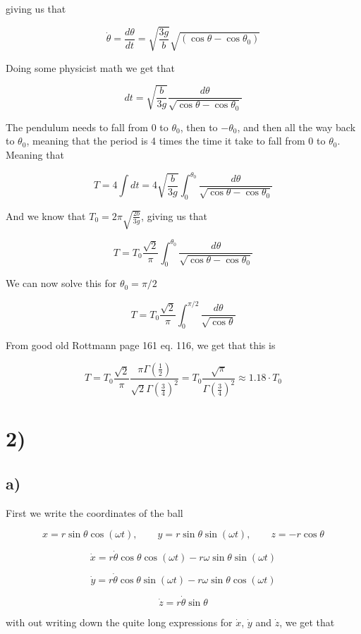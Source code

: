 \documentclass[a4paper,norsk, 10pt]{article}
\begin{document}
giving us that

$$
\dot{\theta} = \frac{d\theta}{dt} = \sqrt{\frac{3g}{b}}\sqrt{(\cos\theta - \cos\theta_0)}
$$

Doing some physicist math we get that

$$
dt = \sqrt{\frac{b}{3g}}\frac{d\theta}{\sqrt{\cos\theta - \cos\theta_0}}
$$

The pendulum needs to fall from $0$ to $\theta_0$, then to $-\theta_0$, and then all the way back to $\theta_0$, meaning that the period is 4 times the time it take to fall from $0$ to $\theta_0$. Meaning that 

$$
T = 4\int dt = 4\sqrt{\frac{b}{3g}}\int_0^{\theta_0} \frac{d\theta}{\sqrt{\cos\theta - \cos\theta_0}}
$$

And we know that $T_0 = 2\pi \sqrt{\frac{2b}{3g}}$, giving us that

$$
T = T_0 \frac{\sqrt{2}}{\pi}\int_0^{\theta_0} \frac{d\theta}{\sqrt{\cos\theta - \cos\theta_0}}
$$

We can now solve this for $\theta_0 = \pi/2$

$$
T = T_0 \frac{\sqrt{2}}{\pi}\int_0^{\pi/2} \frac{d\theta}{\sqrt{\cos\theta}}
$$

From good old Rottmann page 161 eq. 116, we get that this is

$$
T = T_0 \frac{\sqrt{2}}{\pi} \frac{\pi \Gamma(\frac{1}{2})}{\sqrt{2}\Gamma(\frac{3}{4})^2} = T_0\frac{\sqrt{\pi}}{\Gamma(\frac{3}{4})^2} \approx 1.18 \cdot T_0
$$

\section*{2)}
\subsection*{a)}
First we write the coordinates of the ball

$$
x = r\sin\theta \cos(\omega t), \qquad y = r\sin\theta \sin(\omega t), \qquad z = -r\cos \theta
$$

$$
\dot{x} = r\dot{\theta}\cos\theta \cos(\omega t) - r\omega\sin\theta \sin(\omega t) 
$$

$$
\dot{y} = r\dot{\theta}\cos\theta \sin(\omega t) - r\omega\sin\theta \cos(\omega t) 
$$

$$
\dot{z} = r\dot{\theta}\sin \theta
$$

with out writing down the quite long expressions for $\dot{x}$, $\dot{y}$ and $\dot{z}$, we get that
\end{document}
